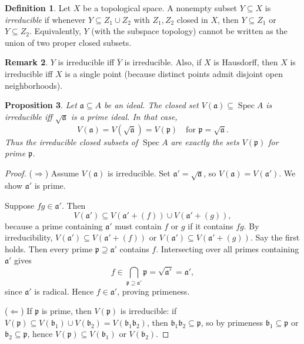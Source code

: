 \documentclass[11pt,a4paper]{article}
\theoremstyle{definition}
\newtheorem{definition}{Definition}[section]
\newtheorem{remark}[definition]{Remark}
\theoremstyle{plain}
\newtheorem{proposition}[definition]{Proposition}
\theoremstyle{remark}
\newcommand{\Spec}{\operatorname{Spec}}
\begin{document}
\begin{definition}
Let $X$ be a topological space. A nonempty subset $Y\subseteq X$ is \emph{irreducible} if
whenever $Y\subseteq Z_1\cup Z_2$ with $Z_1,Z_2$ closed in $X$, then
$Y\subseteq Z_1$ or $Y\subseteq Z_2$.
Equivalently, $Y$ (with the subspace topology) cannot be written as the union of two proper closed subsets.
\end{definition}

\begin{remark}
$Y$ is irreducible iff $\overline{Y}$ is irreducible.
Also, if $X$ is Hausdorff, then $X$ is irreducible iff $X$ is a single point
(because distinct points admit disjoint open neighborhoods).
\end{remark}

\begin{proposition}\label{prop:V(a)-irreducible}
Let $\mathfrak a\subseteq A$ be an ideal. The closed set $V(\mathfrak a)\subseteq \Spec A$
is irreducible iff $\sqrt{\mathfrak a}$ is a prime ideal. In that case,
\[
V(\mathfrak a)=V(\sqrt{\mathfrak a})=V(\mathfrak p)
\quad\text{for }\mathfrak p=\sqrt{\mathfrak a}.
\]
Thus the irreducible closed subsets of $\Spec A$ are exactly the sets $V(\mathfrak p)$ for prime $\mathfrak p$.
\end{proposition}

\begin{proof}
($\Rightarrow$) Assume $V(\mathfrak a)$ is irreducible. Set $\mathfrak a'=\sqrt{\mathfrak a}$,
so $V(\mathfrak a)=V(\mathfrak a')$. We show $\mathfrak a'$ is prime.

Suppose $fg\in \mathfrak a'$. Then
\[
V(\mathfrak a') \subseteq V(\mathfrak a'+(f)) \cup V(\mathfrak a'+(g)),
\]
because a prime containing $\mathfrak a'$ must contain $f$ or $g$ if it contains $fg$.
By irreducibility, $V(\mathfrak a')\subseteq V(\mathfrak a'+(f))$ or $V(\mathfrak a')\subseteq V(\mathfrak a'+(g))$.
Say the first holds. Then every prime $\mathfrak p\supseteq \mathfrak a'$ contains $f$.
Intersecting over all primes containing $\mathfrak a'$ gives
\[
f \in \bigcap_{\mathfrak p\supseteq \mathfrak a'} \mathfrak p = \sqrt{\mathfrak a'}=\mathfrak a',
\]
since $\mathfrak a'$ is radical. Hence $f\in \mathfrak a'$, proving primeness.

($\Leftarrow$) If $\mathfrak p$ is prime, then $V(\mathfrak p)$ is irreducible:
if $V(\mathfrak p)\subseteq V(\mathfrak b_1)\cup V(\mathfrak b_2)=V(\mathfrak b_1\mathfrak b_2)$,
then $\mathfrak b_1\mathfrak b_2\subseteq \mathfrak p$, so by primeness $\mathfrak b_1\subseteq \mathfrak p$
or $\mathfrak b_2\subseteq \mathfrak p$, hence $V(\mathfrak p)\subseteq V(\mathfrak b_1)$ or $V(\mathfrak b_2)$.
\end{proof}
\end{document}
